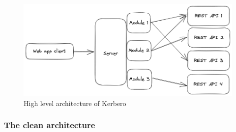 \begin{figure}[ht]
    \centering
    \includegraphics[width=\textwidth]{figures/architecture.excalidraw.png}
    \caption{High level architecture of Kerbero}
    \label{fig:kerberoarchitecture}
\end{figure}

\subsubsection{The clean architecture}
